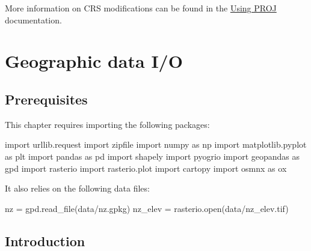 \documentclass[
  letterpaper,
]{krantz}
\newenvironment{Shaded}{\begin{snugshade}}{\end{snugshade}}
\newcommand{\BuiltInTok}[1]{\textcolor[rgb]{0.00,0.23,0.31}{#1}}
\newcommand{\ImportTok}[1]{\textcolor[rgb]{0.00,0.46,0.62}{#1}}
\newcommand{\NormalTok}[1]{\textcolor[rgb]{0.00,0.23,0.31}{#1}}
\newcommand{\OperatorTok}[1]{\textcolor[rgb]{0.37,0.37,0.37}{#1}}
\newcommand{\StringTok}[1]{\textcolor[rgb]{0.13,0.47,0.30}{#1}}
\begin{document}
More information on CRS modifications can be found in the
\href{https://proj.org/usage/index.html}{Using PROJ} documentation.


\chapter{Geographic data I/O}\label{sec-read-write}

\section*{Prerequisites}\label{prerequisites-6}


This chapter requires importing the following packages:

\begin{Shaded}
\begin{Highlighting}[]
\ImportTok{import}\NormalTok{ urllib.request}
\ImportTok{import}\NormalTok{ zipfile}
\ImportTok{import}\NormalTok{ numpy }\ImportTok{as}\NormalTok{ np}
\ImportTok{import}\NormalTok{ matplotlib.pyplot }\ImportTok{as}\NormalTok{ plt}
\ImportTok{import}\NormalTok{ pandas }\ImportTok{as}\NormalTok{ pd}
\ImportTok{import}\NormalTok{ shapely}
\ImportTok{import}\NormalTok{ pyogrio}
\ImportTok{import}\NormalTok{ geopandas }\ImportTok{as}\NormalTok{ gpd}
\ImportTok{import}\NormalTok{ rasterio}
\ImportTok{import}\NormalTok{ rasterio.plot}
\ImportTok{import}\NormalTok{ cartopy}
\ImportTok{import}\NormalTok{ osmnx }\ImportTok{as}\NormalTok{ ox}
\end{Highlighting}
\end{Shaded}

It also relies on the following data files:

\begin{Shaded}
\begin{Highlighting}[]
\NormalTok{nz }\OperatorTok{=}\NormalTok{ gpd.read\_file(}\StringTok{\textquotesingle{}data/nz.gpkg\textquotesingle{}}\NormalTok{)}
\NormalTok{nz\_elev }\OperatorTok{=}\NormalTok{ rasterio.}\BuiltInTok{open}\NormalTok{(}\StringTok{\textquotesingle{}data/nz\_elev.tif\textquotesingle{}}\NormalTok{)}
\end{Highlighting}
\end{Shaded}

\section{Introduction}\label{introduction-6}
\end{document}
